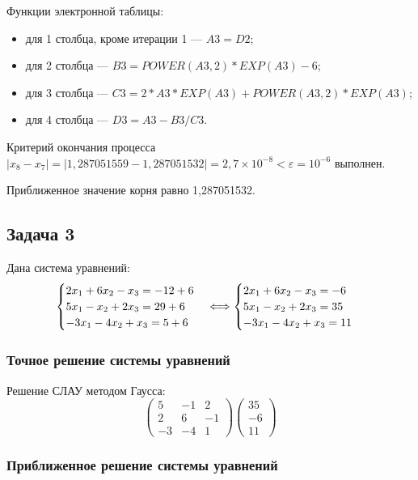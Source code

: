 \documentclass[10pt, a4paper, titlepage]{article}
\begin{document}
Функции электронной таблицы:
\begin{itemize}
    \item для 1 столбца, кроме итерации 1 --- $A3=D2$;
    
    \item для 2 столбца --- $B3=POWER(A3,2)*EXP(A3)-6$;
    
    \item для 3 столбца --- $C3=2*A3*EXP(A3)+POWER(A3,2)*EXP(A3)$;
    
    \item для 4 столбца --- $D3=A3-B3/C3$.
\end{itemize}

Критерий окончания процесса $|x_8-x_7|=|1{,}287051559-1{,}287051532 |=2,7\times10^{-8}<\varepsilon=10^{-6}$ выполнен. 

Приближенное значение корня равно 1,287051532.

\subsection{Задача 3}

Дана система уравнений:
\begin{equation*}
    \begin{cases}
        $$2x_1+6x_2-x_3=-12+6$$ \\
        $$5x_1-x_2+2x_3=29+6$$ \\
        $$-3x_1-4x_2+x_3=5+6$$
    \end{cases}
    \Longleftrightarrow
    \begin{cases}
        $$2x_1+6x_2-x_3=-6$$ \\
        $$5x_1-x_2+2x_3=35$$ \\
        $$-3x_1-4x_2+x_3=11$$
    \end{cases}
\end{equation*}


\subsubsection{Точное решение системы уравнений}

Решение СЛАУ методом Гаусса:
\begin{equation*}
    \begin{pmatrix}
        5 & -1 & 2 \\
        2 & 6 & -1 \\
        -3 & -4 & 1
    \end{pmatrix}
    \begin{pmatrix}
        35 \\
        -6 \\
        11
    \end{pmatrix}
\end{equation*}



\subsubsection{Приближенное решение системы уравнений}
\end{document}
